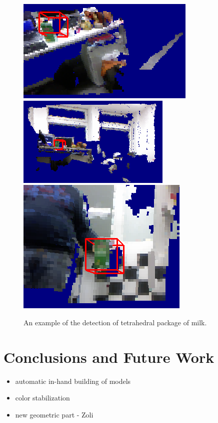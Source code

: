 \documentclass[conference]{sty/IEEEtran}
\begin{document}


\begin{figure}[htb!]
  \begin{center}
    \includegraphics[width=.45\columnwidth]{figures/colorCHLAC/detection7.png}
    \includegraphics[width=.45\columnwidth]{figures/colorCHLAC/detection5.png} \\
    \includegraphics[width=.9\columnwidth]{figures/colorCHLAC/detection2.png}
    \caption{An example of the detection of tetrahedral package of milk.}
    \label{fig:milk_testing}
  \end{center}
\end{figure}


\section{Conclusions and Future Work}
\label{sec:conclusion}
\begin{itemize}
\item automatic in-hand building of models
\item color stabilization
\item new geometric part - Zoli
\end{itemize}
\end{document}
